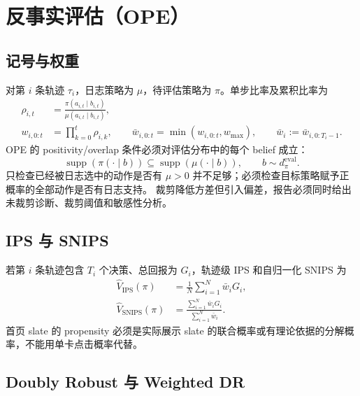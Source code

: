 \documentclass[11pt,a4paper,fontset=none]{ctexart}
\newcommand{\1}{\mathbb{I}}
\begin{document}
\section{反事实评估（OPE）}

\subsection{记号与权重}

对第 $i$ 条轨迹 $\tau_i$，日志策略为 $\mu$，待评估策略为 $\pi$。单步比率及累积比率为
\begin{align}
  \rho_{i,t}&=\frac{\pi(a_{i,t}\mid b_{i,t})}
  {\mu(a_{i,t}\mid b_{i,t})},\\
  w_{i,0:t}&=\prod_{k=0}^{t}\rho_{i,k},\qquad
  \bar w_{i,0:t}=\min(w_{i,0:t},w_{\max}),\qquad
  \bar w_i:=\bar w_{i,0:T_i-1}.
  \label{eq:importance-weight}
\end{align}
OPE 的 positivity/overlap 条件必须对评估分布中的每个 belief 成立：
\begin{equation}
  \operatorname{supp}\!\left(\pi(\cdot\mid b)\right)
  \subseteq
  \operatorname{supp}\!\left(\mu(\cdot\mid b)\right),
  \qquad b\sim d_{\pi}^{\mathrm{eval}}.
  \label{eq:positivity}
\end{equation}
只检查已经被日志选中的动作是否有 $\mu>0$ 并不足够；必须检查目标策略赋予正概率的全部动作是否有日志支持。
裁剪降低方差但引入偏差，报告必须同时给出未裁剪诊断、裁剪阈值和敏感性分析。

\subsection{IPS 与 SNIPS}

若第 $i$ 条轨迹包含 $T_i$ 个决策、总回报为 $G_i$，轨迹级 IPS 和自归一化 SNIPS 为
\begin{align}
  \widehat V_{\mathrm{IPS}}(\pi)
  &=\frac1N\sum_{i=1}^{N}\bar w_iG_i,
  \label{eq:ips}\\
  \widehat V_{\mathrm{SNIPS}}(\pi)
  &=\frac{\sum_{i=1}^{N}\bar w_iG_i}
  {\sum_{i=1}^{N}\bar w_i}.
  \label{eq:snips}
\end{align}
首页 slate 的 propensity 必须是实际展示 slate 的联合概率或有理论依据的分解概率，不能用单卡点击概率代替。

\subsection{Doubly Robust 与 Weighted DR}
\end{document}

